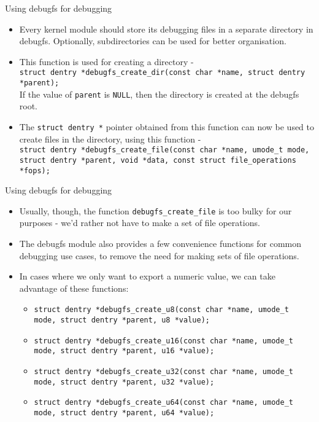 \documentclass{beamer}
\begin{document}
\begin{frame}{Using debugfs for debugging}

  \begin{itemize}
  \item Every kernel module should store its debugging files in a
    separate directory in debugfs. Optionally, subdirectories can be
    used for better organisation.
  \item This function is used for creating a directory - \\
    \texttt{struct dentry *debugfs\_create\_dir(const char *name, struct
      dentry *parent);}\\
    If the value of \texttt{parent} is \texttt{NULL}, then the
    directory is created at the debugfs root.
  \item The \texttt{struct dentry *} pointer obtained from this
    function can now be used to create files in the directory, using
    this function - \\
    \texttt{struct dentry *debugfs\_create\_file(const char *name,
      umode\_t mode,
           struct dentry *parent, void *data,
           const struct file\_operations *fops);}
  \end{itemize}
  
\end{frame}

\begin{frame}{Using debugfs for debugging}

  \begin{itemize}

  \item Usually, though, the function
    \texttt{debugfs\_create\_file} is too bulky for our purposes -
    we'd rather not have to make a set of file operations.
  \item The debugfs module also provides a few convenience functions
    for common debugging use cases, to remove the need for making sets
    of file operations.
  \item In cases where we only want to export a numeric value, we can
    take advantage of these functions:
    \begin{itemize}

    \item \texttt{struct dentry *debugfs\_create\_u8(const char *name, 
      umode\_t mode,
           struct dentry *parent, u8 *value);}
    \item \texttt{struct dentry *debugfs\_create\_u16(const char *name,
      umode\_t mode,
          struct dentry *parent, u16 *value);}
    \item \texttt{struct dentry *debugfs\_create\_u32(const char *name,
      umode\_t mode,
          struct dentry *parent, u32 *value);}
    \item \texttt{struct dentry *debugfs\_create\_u64(const char *name,
      umode\_t mode,
          struct dentry *parent, u64 *value);}

    \end{itemize}

  \end{itemize}

\end{frame}
\end{document}
